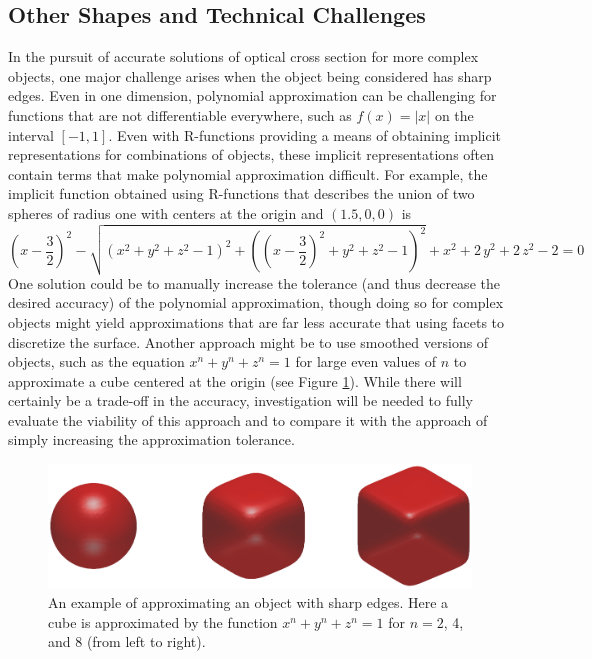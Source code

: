 \documentclass[11pt]{amsart}
\theoremstyle{definition}
\begin{document}
\subsection{Other Shapes and Technical Challenges}

In the pursuit of accurate solutions of optical cross section for more complex objects, one major challenge arises when the object being considered has sharp edges. Even in one dimension, polynomial approximation can be challenging for functions that are not differentiable everywhere, such as $f(x) = |x|$ on the interval $[-1,1]$. Even with R-functions providing a means of obtaining implicit representations for combinations of objects, these implicit representations often contain terms that make polynomial approximation difficult. For example, the implicit function obtained using R-functions that describes the union of two spheres of radius one with centers at the origin and $(1.5,0,0)$ is
\[{\left(x-\frac{3}{2}\right)}^2-\sqrt{{\left(x^2+y^2+z^2-1\right)}^2+{\left({\left(x-\frac{3}{2}\right)}^2+y^2+z^2-1\right)}^2}+x^2+2\,y^2+2\,z^2-2 = 0\]
One solution could be to manually increase the tolerance (and thus decrease the desired accuracy) of the polynomial approximation, though doing so for complex objects might yield approximations that are far less accurate that using facets to discretize the surface. Another approach might be to use smoothed versions of objects, such as the equation $x^n + y^n + z^n = 1$ for large even values of $n$ to approximate a cube centered at the origin (see Figure \ref{cubes}).  While there will certainly be a trade-off in the accuracy, investigation will be needed to fully evaluate the viability of this approach and to compare it with the approach of simply increasing the approximation tolerance.
\begin{figure}[ht]
\includegraphics[width=\linewidth]{./figs/cubes.eps}
\caption{An example of approximating an object with sharp edges. Here a cube is approximated by the function $x^n + y^n + z^n = 1$ for $n = 2$, 4, and 8 (from left to right).}
\label{cubes}
\end{figure}
\end{document}
